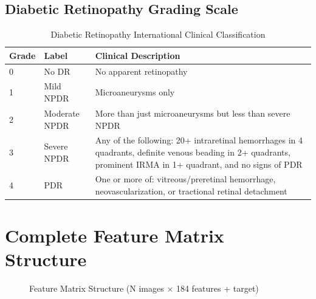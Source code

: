 \documentclass[11pt]{article}
\begin{document}
\subsection{Diabetic Retinopathy Grading Scale}
\begin{table}[h!]
\centering
\begin{tabular}{p{}p{}p{}}
\toprule
\textbf{Grade} & \textbf{Label} & \textbf{Clinical Description} \\
\midrule
0 & No DR & No apparent retinopathy \\
1 & Mild NPDR & Microaneurysms only \\
2 & Moderate NPDR & More than just microaneurysms but less than severe NPDR \\
3 & Severe NPDR & Any of the following: 20+ intraretinal hemorrhages in 4 quadrants, definite venous beading in 2+ quadrants, prominent IRMA in 1+ quadrant, and no signs of PDR \\
4 & PDR & One or more of: vitreous/preretinal hemorrhage, neovascularization, or tractional retinal detachment \\
\bottomrule
\end{tabular}
\caption{Diabetic Retinopathy International Clinical Classification}
\end{table}

\section{Complete Feature Matrix Structure}

\begin{figure}[h!]
\centering
{}
\caption{Feature Matrix Structure (N images × 184 features + target)}
\label{fig:feature_matrix}
\end{figure}
\end{document}
